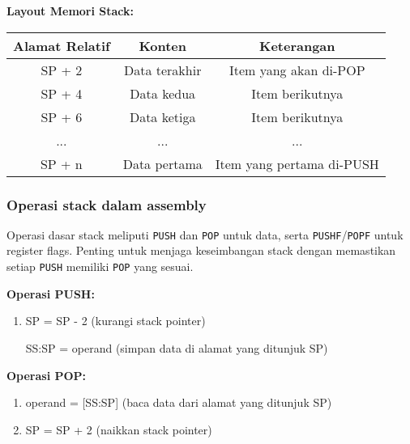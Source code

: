 \documentclass[../main.tex]{subfiles}
\begin{document}
                \textbf{Layout Memori Stack:}
                \begin{center}
                    \begin{tabular}{|c|c|c|}
                        \hline
                        \textbf{Alamat Relatif} & \textbf{Konten} & \textbf{Keterangan} \\
                        \hline
                        SP + 2 & Data terakhir & Item yang akan di-POP \\
                        \hline
                        SP + 4 & Data kedua & Item berikutnya \\
                        \hline
                        SP + 6 & Data ketiga & Item berikutnya \\
                        \hline
                        ... & ... & ... \\
                        \hline
                        SP + n & Data pertama & Item yang pertama di-PUSH \\
                        \hline
                    \end{tabular}
                \end{center}

            \subsubsection{Operasi stack dalam assembly}
                Operasi dasar stack meliputi \texttt{PUSH} dan \texttt{POP} untuk data, serta \texttt{PUSHF}/\texttt{POPF} untuk register flags. Penting untuk menjaga keseimbangan stack dengan memastikan setiap \texttt{PUSH} memiliki \texttt{POP} yang sesuai.

                \textbf{Operasi PUSH:}
                \begin{enumerate}
                    \item SP = SP - 2 (kurangi stack pointer)
                    \item [SS:SP] = operand (simpan data di alamat yang ditunjuk SP)
                \end{enumerate}

                \textbf{Operasi POP:}
                \begin{enumerate}
                    \item operand = [SS:SP] (baca data dari alamat yang ditunjuk SP)
                    \item SP = SP + 2 (naikkan stack pointer)
                \end{enumerate}
\end{document}

